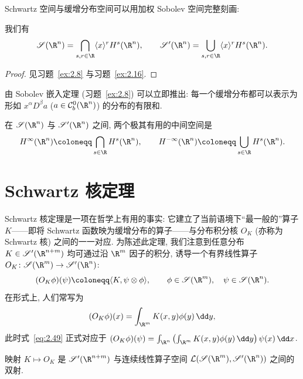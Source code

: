Schwartz 空间与缓增分布空间可以用加权 Sobolev 空间完整刻画:

\begin{theorem}\label{thm:2.18}
我们有
\begin{equation}\label{eq:2.48}
    \Schwartz(\R^n) = \bigcap_{s, r \in \R} \langle x \rangle^r H^s(\R^n), \qquad \TempDistr(\R^n) = \bigcup_{s, r \in \R} \langle x \rangle^r H^s(\R^n).
\end{equation}
\end{theorem}

\begin{proof}
见习题~\ref{ex:2.8} 与习题~\ref{ex:2.16}.
\end{proof}

由 Sobolev 嵌入定理 (习题~\ref{ex:2.8}) 可以立即推出: 每一个缓增分布都可以表示为形如 $x^\alpha D^\beta a$ ($a \in \mathcal{C}_b^0(\R^n)$) 的分布的有限和.

在 $\Schwartz(\R^n)$ 与 $\TempDistr(\R^n)$ 之间, 两个极其有用的中间空间是
\begin{equation*}
    H^\infty(\R^n) \defeq \bigcap_{s \in \R} H^s(\R^n), \qquad H^{-\infty}(\R^n) \defeq \bigcup_{s \in \R} H^s(\R^n).
\end{equation*}

\section{Schwartz 核定理}\label{sec:2.4}
%

Schwartz 核定理是一项在哲学上有用的事实: 它建立了当前语境下``最一般的''算子 $K$——即将 Schwartz 函数映为缓增分布的算子——与分布积分核 $O_K$ (亦称为 Schwartz 核) 之间的一一对应. 为陈述此定理, 我们注意到任意分布 $K \in \TempDistr(\R^{n+m})$ 均可通过沿 $\R^m$ 因子的积分, 诱导一个有界线性算子 $O_K \colon \Schwartz(\R^m) \to \TempDistr(\R^n)$:
\begin{equation}\label{eq:2.49}
    (O_K \phi)(\psi) \defeq \langle K, \psi \otimes \phi \rangle, \qquad \phi \in \Schwartz(\R^m), \quad \psi \in \Schwartz(\R^n).
\end{equation}
在形式上, 人们常写为
\begin{equation}\label{eq:2.50}
    (O_K \phi)(x) = \int_{\R^m} K(x, y) \phi(y) \,\dd y,
\end{equation}
此时式~\eqref{eq:2.49} 正式对应于 $(O_K \phi)(\psi) = \int_{\R^n} \left( \int_{\R^m} K(x, y) \phi(y) \,\dd y \right) \psi(x) \,\dd x$.

\begin{theorem}\label{thm:2.19}
映射 $K \mapsto O_K$ 是 $\TempDistr(\R^{n+m})$ 与连续线性算子空间 $\mathcal{L}(\Schwartz(\R^m), \TempDistr(\R^n))$ 之间的双射.
\end{theorem}

